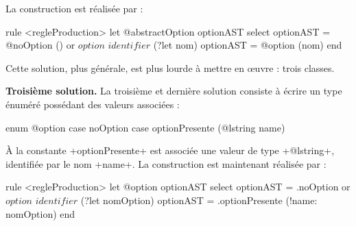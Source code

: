 La construction est réalisée par :
\begin{galgas4}
rule <regleProduction> {
  let @abstractOption optionAST
  select
    optionAST = @noOption ()
  or
    $option$
    $identifier$ (?let nom)
    optionAST = @option (nom)
  end
}
\end{galgas4}

Cette solution, plus générale, est plus lourde à mettre en œuvre : trois classes.

\textbf{Troisième solution.} La troisième et dernière solution consiste à écrire un type énuméré possédant des valeurs associées :

\begin{galgas4}
enum @option {
  case noOption
  case optionPresente (@lstring name)
}
\end{galgas4}

À la constante \ggst+optionPresente+ est associée une valeur de type \ggst+@lstring+, identifiée par le nom \ggst+name+. La construction est maintenant réalisée par :
\begin{galgas4}
rule <regleProduction> {
  let @option optionAST
  select
    optionAST = .noOption
  or
    $option$
    $identifier$ (?let nomOption)
    optionAST = .optionPresente (!name: nomOption)
  end
}
\end{galgas4}












